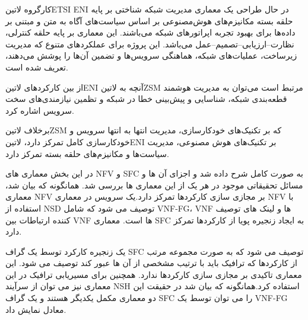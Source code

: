 

کارگروه ‌لاتین{ETSI ENI} در حال طراحی یک معماری مدیریت شبکه شناختی
بر پایه حلقه بسته مکانیزم‌های هوش‌مصنوعی بر اساس سیاست‌های آگاه به متن و مبتنی بر داده‌ها
برای بهبود تجربه اپراتورهای شبکه می‌باشند.
این معماری بر پایه حلقه کنترلی، نظارت--ارزیابی--تصمیم--عمل می‌باشد.
این پروژه برای عملکردهای متنوع که مدیریت زیرساخت، عملیات‌های شبکه،
هماهنگی سرویس‌ها و تضمین آن‌ها را پوشش می‌دهند،‌ تعریف شده است.


از بین کارکردهای ‌لاتین{ENI} آنچه به ‌لاتین{ZSM} مرتبط است
می‌توان به مدیریت هوشمند قطعه‌بندی شبکه، شناسایی و پیش‌بینی خطا در شبکه
و تظمین نیازمندی‌های سخت سرویس اشاره کرد.

برخلاف ‌لاتین{ZSM} که بر تکنیک‌های خودکارسازی، مدیریت انتها به انتها سرویس و
خودکارسازی کامل تمرکز دارد، ‌لاتین{ENI} بر تکنیک‌های هوش مصنوعی، مدیریت سیاست‌‌ها
و مکانیزم‌های حلقه بسته تمرکز دارد.


در این بخش معماری های NFV و SFC به صورت کامل شرح داده شد و اجزای آن ها و مسائل تحقیقاتی موجود در هر یک  از این معماری ها بررسی شد. همانگونه که بیان شد، معماری NFV بر مجازی سازی کارکردها تمرکز دارد.یک سرویس در معماری NFV با استفاده از NSD توصیف می شود که شامل VNF-FG، VNF ها و لینک های توصیف کننده ارتباطات بین VNF ها است. معماری SFC به ایجاد زنجیره پویا از کارکردها تمرکز دارد.

یک زنجیره کارکرد توسط یک گراف SFC توصیف می شود که به صورت مجموعه مرتب از کارکردها که ترافیک باید با ترتیب مشخصی از آن ها عبور کند توصیف می شود. این معماری تاکیدی بر مجازی سازی کارکردها ندارد. همچنین برای مسیریابی ترافیک در این معماری نیز می توان از سرآیند NSH استفاده کرد.همانگونه که بیان شد در حقیقت این دو معماری مکمل یکدیگر هستند و یک گراف SFC را می توان توسط یک VNF-FG معادل نمایش داد.
